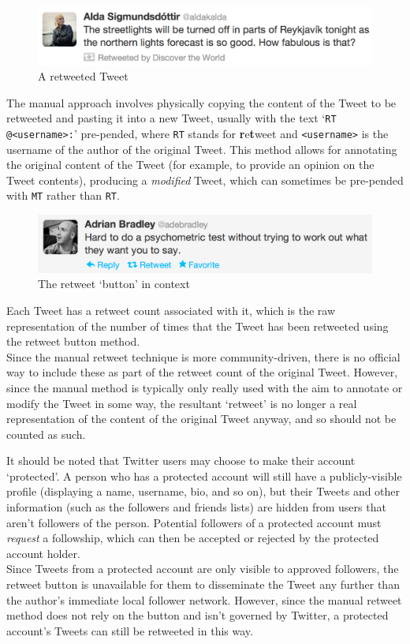 \begin{figure}[h]
\centering
\includegraphics[scale=0.3]{2.Background/Media/northern_lights_tweet.png} 
\caption{A retweeted Tweet}
\label{fig:northern_lights_tweet}
\end{figure}

The manual approach involves physically copying the content of the Tweet to be retweeted and pasting it into a new Tweet, usually with the text `\texttt{RT @<username>:}' pre-pended, where \texttt{RT} stands for \textbf{r}e\textbf{t}weet and \texttt{<username>} is the username of the author of the original Tweet. This method allows for annotating the original content of the Tweet (for example, to provide an opinion on the Tweet contents), producing a \textit{modified} Tweet, which can sometimes be pre-pended with \texttt{MT} rather than \texttt{RT}.

\begin{figure}[h]
\centering
\includegraphics[scale=0.3]{2.Background/Media/retweet_button.png} 
\caption{The retweet `button' in context}
\label{fig:retweet_button}
\end{figure}

Each Tweet has a retweet count associated with it, which is the raw representation of the number of times that the Tweet has been retweeted using the retweet button method.\\
Since the manual retweet technique is more community-driven, there is no official way to include these as part of the retweet count of the original Tweet. However, since the manual method is typically only really used with the aim to annotate or modify the Tweet in some way, the resultant `retweet'  is no longer a real representation of the content of the original Tweet anyway, and so should not be counted as such.

It should be noted that Twitter users may choose to make their account `protected'. A person who has a protected account will still have a publicly-visible profile (displaying a name, username, bio, and so on), but their Tweets and other information (such as the followers and friends lists) are hidden from users that aren't followers of the person. Potential followers of a protected account must \textit{request} a followship, which can then be accepted or rejected by the protected account holder. \\
Since Tweets from a protected account are only visible to approved followers, the retweet button is unavailable for them to disseminate the Tweet any further than the author's immediate local follower network. However, since the manual retweet method does not rely on the button and isn't governed by Twitter, a protected account's Tweets can still be retweeted in this way.

